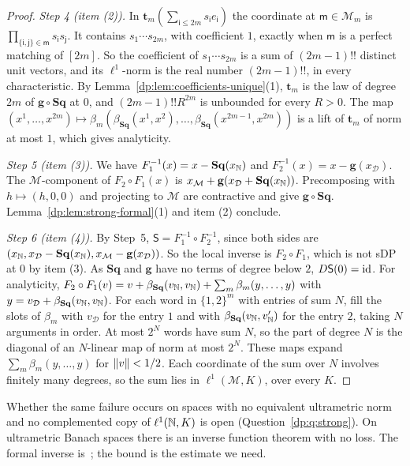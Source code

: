 \begin{proof}
\emph{Step 4 (item (2)).} In $\mathbf t_m(\sum_{\mathsf i\le2m}s_{\mathsf i}e_{\mathsf i})$ the coordinate at $\mathsf m\in\mathcal M_m$ is $\prod_{\{\mathsf i,\mathsf j\}\in\mathsf m}s_{\mathsf i}s_{\mathsf j}$. It contains $s_1\cdots s_{2m}$, with coefficient $1$, exactly when $\mathsf m$ is a perfect matching of $[2m]$. So the coefficient of $s_1\cdots s_{2m}$ is a sum of $(2m-1)!!$ distinct unit vectors, and its $\ell^1$-norm is the real number $(2m-1)!!$, in every characteristic. By Lemma~\ref{dp:lem:coefficients-unique}(1), $\mathbf t_m$ is the law of degree $2m$ of $\mathbf g\circ\mathbf{Sq}$ at $0$, and $(2m-1)!!R^{2m}$ is unbounded for every $R>0$. The map $(x^1,\dots,x^{2m})\mapsto\beta_m(\beta_{\mathbf{Sq}}(x^1,x^2),\dots,\beta_{\mathbf{Sq}}(x^{2m-1},x^{2m}))$ is a lift of $\mathbf t_m$ of norm at most $1$, which gives analyticity.

\emph{Step 5 (item (3)).} We have $F_1^{-1}(x)=x-\mathbf{Sq}(x_\mathbb N)$ and $F_2^{-1}(x)=x-\mathbf g(x_{\mathcal D})$. The $\mathcal M$-component of $F_2\circ F_1(x)$ is $x_{\mathcal M}+\mathbf g(x_{\mathcal D}+\mathbf{Sq}(x_\mathbb N))$. Precomposing with $h\mapsto(h,0,0)$ and projecting to $\mathcal M$ are contractive and give $\mathbf g\circ\mathbf{Sq}$. Lemma~\ref{dp:lem:strong-formal}(1) and item (2) conclude.

\emph{Step 6 (item (4)).} By Step~5, $\mathsf S=F_1^{-1}\circ F_2^{-1}$, since both sides are $(x_\mathbb N,x_{\mathcal D}-\mathbf{Sq}(x_\mathbb N),x_{\mathcal M}-\mathbf g(x_{\mathcal D}))$. So the local inverse is $F_2\circ F_1$, which is not sDP at $0$ by item (3). As $\mathbf{Sq}$ and $\mathbf g$ have no terms of degree below $2$, $D\mathsf S(0)=\mathrm{id}$. For analyticity, $F_2\circ F_1(v)=v+\beta_{\mathbf{Sq}}(v_\mathbb N,v_\mathbb N)+\sum_m\beta_m(y,\dots,y)$ with $y=v_{\mathcal D}+\beta_{\mathbf{Sq}}(v_\mathbb N,v_\mathbb N)$. For each word in $\{1,2\}^m$ with entries of sum $N$, fill the slots of $\beta_m$ with $v_{\mathcal D}$ for the entry $1$ and with $\beta_{\mathbf{Sq}}(v_\mathbb N,v'_\mathbb N)$ for the entry $2$, taking $N$ arguments in order. At most $2^N$ words have sum $N$, so the part of degree $N$ is the diagonal of an $N$\nobreakdash-linear map of norm at most $2^N$. These maps expand $\sum_m\beta_m(y,\dots,y)$ for $\lVert v\rVert<1/2$. Each coordinate of the sum over $N$ involves finitely many degrees, so the sum lies in $\ell^1(\mathcal M,K)$, over every $K$.
\end{proof}

Whether the same failure occurs on spaces with no equivalent ultrametric norm and no complemented copy of $\ell^1(\mathbb N,K)$ is open (Question~\ref{dp:q:strong}). On ultrametric Banach spaces there is an inverse function theorem with no loss. The formal inverse is~\cite[Th.~VI.3, Prop.~VI.8]{Ro}; the bound is the estimate we need.

